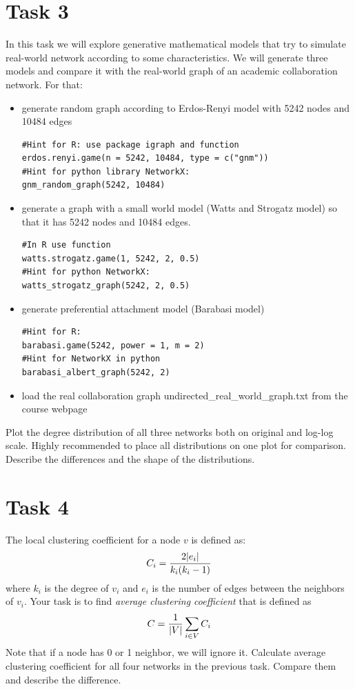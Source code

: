 \documentclass{article}
\DeclarePairedDelimiter\abs{\lvert}{\rvert}%
\begin{document}
\section*{Task 3}
In this task we will explore generative mathematical models that try to simulate real-world network according to some characteristics. We will generate three models and compare it with the real-world graph of an academic collaboration network. For that:
\begin{itemize}
\item generate random graph according to Erdos-Renyi model with 5242 nodes and 10484 edges 
\begin{lstlisting}
#Hint for R: use package igraph and function 
erdos.renyi.game(n = 5242, 10484, type = c("gnm"))
#Hint for python library NetworkX: 
gnm_random_graph(5242, 10484)
\end{lstlisting}
\item generate a graph with a small world model (Watts and Strogatz model) so that it has 5242 nodes and 10484 edges. 
\begin{lstlisting}
#In R use function
watts.strogatz.game(1, 5242, 2, 0.5)
#Hint for python NetworkX: 
watts_strogatz_graph(5242, 2, 0.5)
\end{lstlisting}
\item generate preferential attachment model (Barabasi model)
\begin{lstlisting}
#Hint for R: 
barabasi.game(5242, power = 1, m = 2)
#Hint for NetworkX in python 
barabasi_albert_graph(5242, 2)
\end{lstlisting}
\item  load the real collaboration graph undirected\_real\_world\_graph.txt from the course webpage
\end{itemize}
Plot the degree distribution of all three networks both on original and log-log scale. Highly recommended to place all distributions on one plot for comparison. Describe the differences and the shape of the distributions.
 
\section*{Task 4}
The local clustering coefficient for a node $v$ is defined as:
$$C_i = \frac{2\abs{e_i}}{k_i(k_i-1)}$$
where $k_i$ is the degree of $v_i$ and $e_i$ is the number of edges between the neighbors of $v_i$. Your task is to find \emph{average clustering coefficient} that is defined as 
$$C = \frac{1}{\abs{V}}\sum_{i\in V}C_i$$
Note that if a node has 0 or 1 neighbor, we will ignore it.
Calculate average clustering coefficient for all four networks in the previous task. Compare them and describe the difference. 
\end{document}
